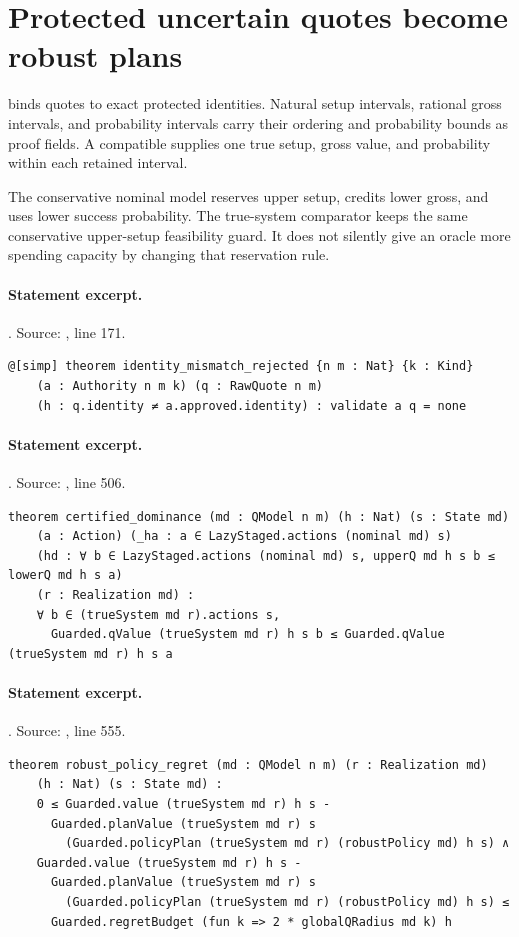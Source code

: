 \documentclass[11pt]{article}
\begin{document}
\section{Protected uncertain quotes become robust plans}
 binds quotes to exact protected identities. Natural
setup intervals, rational gross intervals, and probability intervals carry
their ordering and probability bounds as proof fields. A compatible
 supplies one true setup, gross value, and probability within
each retained interval.

The conservative nominal model reserves upper setup, credits lower gross,
and uses lower success probability. The true-system comparator keeps the same
conservative upper-setup feasibility guard. It does not silently give an oracle
more spending capacity by changing that reservation rule.

\paragraph{Statement excerpt.}. Source: , line 171.
\begin{lstlisting}[style=AVOCSource]
@[simp] theorem identity_mismatch_rejected {n m : Nat} {k : Kind}
    (a : Authority n m k) (q : RawQuote n m)
    (h : q.identity ≠ a.approved.identity) : validate a q = none
\end{lstlisting}

\paragraph{Statement excerpt.}. Source: , line 506.
\begin{lstlisting}[style=AVOCSource]
theorem certified_dominance (md : QModel n m) (h : Nat) (s : State md)
    (a : Action) (_ha : a ∈ LazyStaged.actions (nominal md) s)
    (hd : ∀ b ∈ LazyStaged.actions (nominal md) s, upperQ md h s b ≤ lowerQ md h s a)
    (r : Realization md) :
    ∀ b ∈ (trueSystem md r).actions s,
      Guarded.qValue (trueSystem md r) h s b ≤ Guarded.qValue (trueSystem md r) h s a
\end{lstlisting}

\paragraph{Statement excerpt.}. Source: , line 555.
\begin{lstlisting}[style=AVOCSource]
theorem robust_policy_regret (md : QModel n m) (r : Realization md)
    (h : Nat) (s : State md) :
    0 ≤ Guarded.value (trueSystem md r) h s -
      Guarded.planValue (trueSystem md r) s
        (Guarded.policyPlan (trueSystem md r) (robustPolicy md) h s) ∧
    Guarded.value (trueSystem md r) h s -
      Guarded.planValue (trueSystem md r) s
        (Guarded.policyPlan (trueSystem md r) (robustPolicy md) h s) ≤
      Guarded.regretBudget (fun k => 2 * globalQRadius md k) h
\end{lstlisting}
\end{document}
